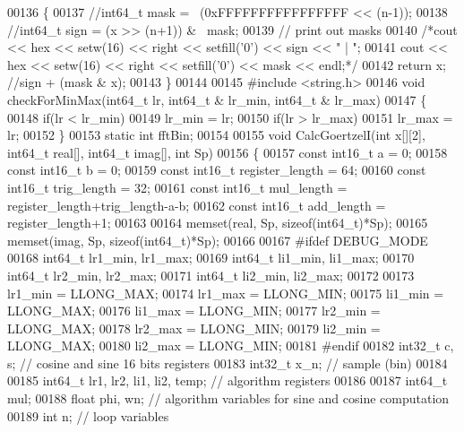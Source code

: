 \begin{DoxyCode}
00136 \{
00137     \textcolor{comment}{//int64\_t mask = ~(0xFFFFFFFFFFFFFFFF << (n-1));}
00138     \textcolor{comment}{//int64\_t sign = (x >> (n+1)) & ~mask;}
00139     \textcolor{comment}{// print out masks}
00140     \textcolor{comment}{/*cout << hex << setw(16) << right << setfill('0') << sign << " | ";}
00141 \textcolor{comment}{    cout << hex << setw(16) << right << setfill('0') << mask << endl;*/}
00142     \textcolor{keywordflow}{return} x; \textcolor{comment}{//sign + (mask & x);}
00143 \}
00144 
00145 \textcolor{preprocessor}{#include <string.h>}
00146 \textcolor{keywordtype}{void} checkForMinMax(int64\_t lr, int64\_t & lr\_min, int64\_t & lr\_max)
00147 \{
00148     \textcolor{keywordflow}{if}(lr < lr\_min)
00149         lr\_min = lr;
00150     \textcolor{keywordflow}{if}(lr > lr\_max)
00151         lr\_max = lr;
00152 \}
00153 \textcolor{keyword}{static} \textcolor{keywordtype}{int} fftBin;
00154 
00155 \textcolor{keywordtype}{void} CalcGoertzelI(\textcolor{keywordtype}{int} x[][2], int64\_t real[], int64\_t imag[], \textcolor{keywordtype}{int} Sp)
00156 \{
00157   \textcolor{keyword}{const} int16\_t a = 0;
00158   \textcolor{keyword}{const} int16\_t b = 0;
00159   \textcolor{keyword}{const} int16\_t register\_length = 64;
00160   \textcolor{keyword}{const} int16\_t trig\_length = 32;
00161   \textcolor{keyword}{const} int16\_t mul\_length  = register\_length+trig\_length-a-b;
00162   \textcolor{keyword}{const} int16\_t add\_length  = register\_length+1;
00163 
00164   memset(real, Sp, \textcolor{keyword}{sizeof}(int64\_t)*Sp);
00165   memset(imag, Sp, \textcolor{keyword}{sizeof}(int64\_t)*Sp);
00166 
00167 \textcolor{preprocessor}{  #ifdef DEBUG\_MODE}
00168       int64\_t lr1\_min, lr1\_max;
00169       int64\_t li1\_min, li1\_max;
00170       int64\_t lr2\_min, lr2\_max;
00171       int64\_t li2\_min, li2\_max;
00172 
00173       lr1\_min = LLONG\_MAX;
00174       lr1\_max = LLONG\_MIN;
00175       li1\_min = LLONG\_MAX;
00176       li1\_max = LLONG\_MIN;
00177       lr2\_min = LLONG\_MAX;
00178       lr2\_max = LLONG\_MIN;
00179       li2\_min = LLONG\_MAX;
00180       li2\_max = LLONG\_MIN;
00181 \textcolor{preprocessor}{  #endif}
00182   int32\_t c, s;     \textcolor{comment}{// cosine and sine 16 bits registers}
00183   int32\_t x\_n;      \textcolor{comment}{// sample (bin)}
00184 
00185   int64\_t lr1, lr2, li1, li2, temp; \textcolor{comment}{// algorithm registers}
00186 
00187   int64\_t mul;
00188   \textcolor{keywordtype}{float} phi, wn;    \textcolor{comment}{// algorithm variables for sine and cosine computation}
00189   \textcolor{keywordtype}{int} n;         \textcolor{comment}{// loop variables}

\end{DoxyCode}

